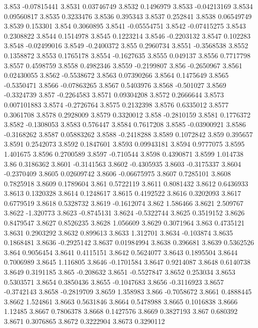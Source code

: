 3.853  -0.07815441
3.8531  0.03746749
3.8532  0.1496979
3.8533  -0.04213169
3.8534  0.09560817
3.8535  0.3233476
3.8536  0.395343
3.8537  0.252841
3.8538  0.06549749
3.8539  0.153301
3.854  0.3060895
3.8541  -0.05554751
3.8542  -0.07415275
3.8543  0.2308822
3.8544  0.1514978
3.8545  0.1223214
3.8546  -0.2203132
3.8547  0.102283
3.8548  -0.02499016
3.8549  -0.2400372
3.855  0.2960734
3.8551  -0.3568538
3.8552  0.1358872
3.8553  0.1765178
3.8554  -0.1627635
3.8555  0.049137
3.8556  0.7717798
3.8557  0.4598759
3.8558  0.4982346
3.8559  -0.2199807
3.856  -0.2650967
3.8561  0.02430055
3.8562  -0.5538672
3.8563  0.07390266
3.8564  0.1475649
3.8565  -0.5350471
3.8566  -0.07863265
3.8567  0.5403976
3.8568  -0.501027
3.8569  -0.3324739
3.857  -0.2264583
3.8571  0.09304208
3.8572  0.2666644
3.8573  0.007101883
3.8574  -0.2726764
3.8575  0.2132398
3.8576  0.6335012
3.8577  0.3061708
3.8578  0.2928009
3.8579  0.3320012
3.858  -0.2810159
3.8581  0.1776372
3.8582  -0.1308053
3.8583  0.576447
3.8584  0.7617208
3.8585  -0.03900921
3.8586  -0.3168262
3.8587  0.05883262
3.8588  -0.2418288
3.8589  0.1072842
3.859  0.395657
3.8591  0.2542073
3.8592  0.1847601
3.8593  0.09943181
3.8594  0.9777075
3.8595  1.401675
3.8596  0.2700589
3.8597  -0.710544
3.8598  0.4390871
3.8599  1.014738
3.86  0.3186362
3.8601  -0.3141563
3.8602  -0.4305935
3.8603  -0.3175337
3.8604  -0.2370409
3.8605  0.02609742
3.8606  -0.06675975
3.8607  0.7285101
3.8608  0.7825918
3.8609  0.1789604
3.861  0.5722119
3.8611  0.8081432
3.8612  0.6436933
3.8613  0.1320328
3.8614  0.1248617
3.8615  0.4192522
3.8616  0.3202093
3.8617  0.6779519
3.8618  0.5328732
3.8619  -0.1612074
3.862  1.586466
3.8621  2.509767
3.8622  -1.320773
3.8623  -0.8745131
3.8624  -0.5322744
3.8625  0.3519152
3.8626  0.8479547
3.8627  0.8526235
3.8628  1.056609
3.8629  0.3071964
3.863  0.4735121
3.8631  0.2903292
3.8632  0.899613
3.8633  1.312701
3.8634  -0.103874
3.8635  0.1868481
3.8636  -0.2925142
3.8637  0.01984994
3.8638  0.396681
3.8639  0.5362526
3.864  0.9056454
3.8641  0.4115151
3.8642  0.5624077
3.8643  0.1895504
3.8644  0.7006989
3.8645  1.116805
3.8646  -0.1701584
3.8647  0.9214087
3.8648  0.6140738
3.8649  0.3191185
3.865  -0.208632
3.8651  -0.5527847
3.8652  0.253034
3.8653  0.5303571
3.8654  0.3850436
3.8655  -0.1047683
3.8656  -0.3116923
3.8657  -0.3742143
3.8658  -0.2819709
3.8659  1.358983
3.866  -0.7058672
3.8661  0.4888445
3.8662  1.524861
3.8663  0.5631846
3.8664  0.5478988
3.8665  0.1016838
3.8666  1.12485
3.8667  0.7806378
3.8668  0.1427576
3.8669  0.3827193
3.867  0.680392
3.8671  0.3076865
3.8672  0.3222904
3.8673  0.3290112
